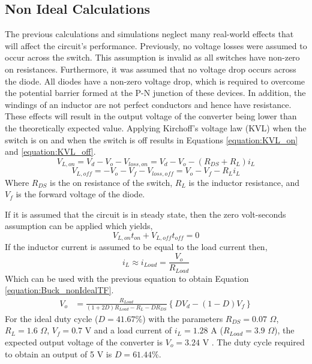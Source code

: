 \documentclass[12pt,twoside]{scrartcl}
\begin{document}
\subsection{Non Ideal Calculations}
The previous calculations and simulations neglect many real-world effects that will affect the circuit's performance. Previously, no voltage losses were assumed to occur across the switch. This assumption is invalid as all switches have non-zero on resistances. Furthermore, it was assumed that no voltage drop occurs across the diode. All diodes have a non-zero voltage drop, which is required to overcome the potential barrier formed at the P-N junction of these devices. In addition, the windings of an inductor are not perfect conductors and hence have resistance. These effects will result in the output voltage of the converter being lower than the theoretically expected value. Applying Kirchoff’s voltage law (KVL) when the switch is on and when the switch is off results in Equations \ref{equation:KVL_on} and \ref{equation:KVL_off}.
\begin{equation}
V_{L,on} = V_{d} - V_{o} - V_{loss, on} = V_{d} - V_{o} - (R_{DS}+ R_{L})i_{L} \label{equation:KVL_on}
\end{equation}
\begin{equation}
V_{L,off} = -V_{o} - V_{f} - V_{loss, off} = V_{o} - V_{f} - R_{L}i_{L}\label{equation:KVL_off}
\end{equation}
Where $R_{DS}$ is the on resistance of the switch, $R_{L}$ is the inductor resistance, and $V_{f}$ is the forward voltage of the diode.\par
\vspace{5mm}
\noindent If it is assumed that the circuit is in steady state, then the zero volt-seconds assumption can be applied which yields,
\begin{equation*}
V_{L,on}t_{on} + V_{L,off}t_{off} = 0
\end{equation*}
If the inductor current is assumed to be equal to the load current then,
\begin{equation*}
i_{L} \approx i_{Load} = \frac{V_{o}}{R_{Load}}
\end{equation*}
Which can be used with the previous equation to obtain Equation \ref{equation:Buck_nonIdealTF}.
\begin{align}
V_{o} &= \frac{R_{Load}}{(1+2D)R_{Load} - R_{L} - DR_{DS}}\left\{DV_{d} - (1-D)V_{f} \label{equation:Buck_nonIdealTF}\right\}
\end{align}
\noindent For the ideal duty cycle ($D = 41.67$\%) with the parameters $R_{DS} = 0.07$ $\Omega$, $R_{L} = 1.6$ $\Omega$, $V_{f} = 0.7$ V and a load current of $i_{L} = 1.28$ A ($R_{Load} = 3.9$ $\Omega$), the expected output voltage of the converter is $V_{o} =3.24$ V \cite{RN1, RN3, RN4}. The duty cycle required to obtain an output of 5 V is $D = 61.44$\%.\par
\end{document}

